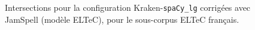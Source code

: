 \begin{figure}[h!]
\caption{Intersections pour la configuration Kraken-\texttt{spaCy\_lg} corrigées avec JamSpell (modèle ELTeC), pour le sous-corpus ELTeC français.}
\label{fig:intersection_globale-kraken}
\end{figure}

